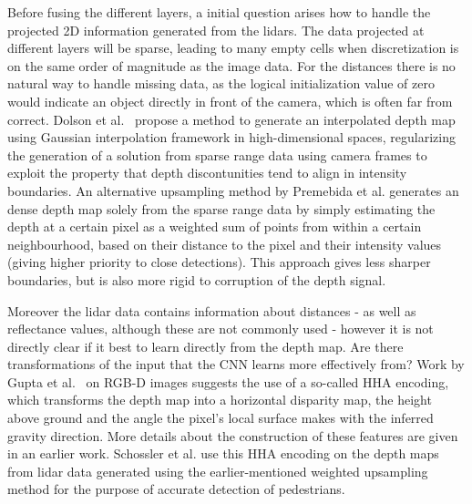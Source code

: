 Before fusing the different layers, a initial question arises how to handle the projected 2D information generated from the lidars. The data projected at different layers will be sparse, leading to many empty cells when discretization is on the same order of magnitude as the image data. For the distances there is no natural way to handle missing data, as the logical initialization value of zero would indicate an object directly in front of the camera, which is often far from correct. Dolson et al.~\cite{dolson2010} propose a method to generate an interpolated depth map using Gaussian interpolation framework in high-dimensional spaces, regularizing the generation of a solution from sparse range data using camera frames to exploit the property that depth discontunities tend to align in intensity boundaries. An alternative upsampling method by Premebida et al.\cite{premebida2014} generates an dense depth map solely from the sparse range data by simply estimating the depth at a certain pixel as a weighted sum of points from within a certain neighbourhood, based on their distance to the pixel and their intensity values (giving higher priority to close detections). This approach gives less sharper boundaries, but is also more rigid to corruption of the depth signal.  

Moreover the lidar data contains information about distances - as well as reflectance values, although these are not commonly used - however it is not directly clear if it best to learn directly from the depth map. Are there transformations of the input that the CNN learns more effectively from? Work by Gupta et al.~\cite{gupta2014} on RGB-D images suggests the use of a so-called HHA encoding, which transforms the depth map into a horizontal disparity map, the height above ground and the angle the pixel's local surface makes with the inferred gravity direction. More details about the construction of these features are given in an earlier work\cite{gupta2013}. Schossler et al.\cite{schlosser2016} use this HHA encoding on the depth maps from lidar data generated using the earlier-mentioned weighted upsampling method\cite{premebida2014} for the purpose of accurate detection of pedestrians.
